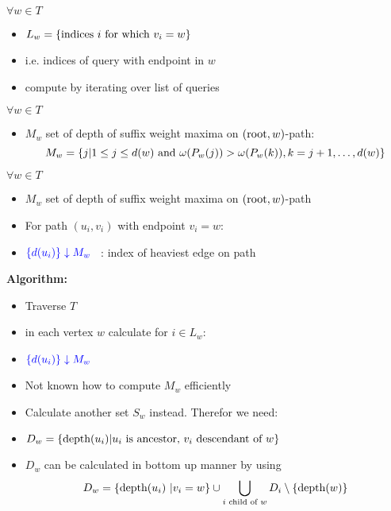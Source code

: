 \documentclass[18pt]{beamer}
\begin{document}
\begin{frame}
\begin{overprint}
\begin{itemize}
			\end{itemize}
			$\forall w \in T$
			\begin{itemize}
				\item $L_w = \{\textup{indices } i \textup{ for which } v_i = w\}$
				\item i.e. indices of query with endpoint in $w$
				\item compute by iterating over list of queries
			\end{itemize}
			$\forall w \in T$
			\begin{itemize}
				\item $M_w$ set of depth of suffix weight maxima on $(\textup{root},w)$-path:
				\[
				M_w = \{j | 1 \le j \le d(w) \textup{ and } \omega(P_w(j)) > \omega(P_w(k)), k = j+1, \dots, d(w)\}
				\]
			\end{itemize}
			$\forall w \in T$
			\begin{itemize}
				\item $M_w$ set of depth of suffix weight maxima on $(\textup{root},w)$-path
				\item For path {\color{blue}$(u_i,v_i)$} with endpoint $v_i = w$:
				\item [] $\color{blue}\{d(u_i)\} \downarrow M_{w}$ \ : index of heaviest edge on path
			\end{itemize}
		\textbf{Algorithm:}
		\begin{itemize}
			\item  Traverse $T$ 
			\item  in each vertex $w$ calculate for $i \in L_w$:
			\item  [] $\color{blue}\{d(u_i)\} \downarrow M_{w}$
		\end{itemize}
		\begin{itemize}
			\item Not known how to compute $M_w$ efficiently
			\item Calculate another set $S_w$ instead. Therefor we need:
			\item $D_w = \{\textup{depth}(u_i) | u_i \textup{ is ancestor, } v_i \textup{ descendant of } w\}$
		\end{itemize}
	 	\begin{itemize}
	 		\item $D_w$ can be calculated in bottom up manner by using 
	 		 \[D_w = \{\textup{depth}(u_i) \ | v_i = w\} \cup \bigcup_{i \textup{ child of } w } D_i \setminus \{\textup{depth}(w)\}\]
	 	\end{itemize}

\end{overprint}
\end{frame}
\end{document}
